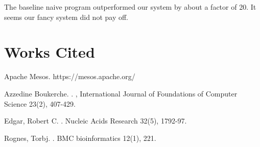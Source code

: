 \documentclass[12pt]{article}
\begin{document}
The baseline naive program outperformed our system by about a factor of 20.
It seems our fancy system did not pay off.


\section{Works Cited}





\begin{thebibliography}{9}

    Apache Mesos. https://mesos.apache.org/

Azzedine Boukerche.
.
,
\newblock International Journal of Foundations of Computer Science 23(2), 407-429.

Edgar, Robert C.
.
\newblock Nucleic Acids Research 32(5), 1792-97.

Rognes, Torbj.
.
\newblock BMC bioinformatics 12(1), 221.







\end{thebibliography}
\end{document}
